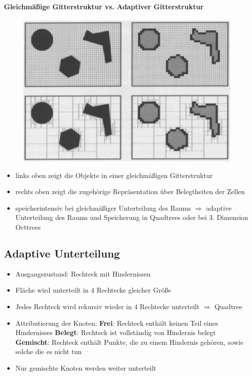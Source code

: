 \paragraph{Gleichmäßige Gitterstruktur vs. Adaptiver Gitterstruktur}
\begin{figure}[H]
	\begin{center}
		\includegraphics[scale=0.5]{Resources/PNG/Quadtrees.PNG}
		\caption{}
		\label{fig:PNG/Quadtrees.PNG}
	\end{center}
\end{figure}
\begin{itemize}
	\item links oben zeigt die Objekte in einer gleichmäßigen Gitterstruktur
	\item rechts oben zeigt die zugehörige Repräsentation über Belegtheiten der Zellen
	\item speicherintensiv bei gleichmäßiger Unterteilung des Raums $\Rightarrow$ adaptive Unterteilung des Raums und Speicherung in Quadtrees oder bei 3. Dimension Octtrees
\end{itemize}
\subsection{Adaptive Unterteilung}
\begin{itemize}
	\item Ausgangszustand: Rechteck mit Hindernissen
	\item Fläche wird unterteilt in 4 Rechtecke gleicher Größe
	\item Jedes Rechteck wird rekursiv wieder in 4 Rechtecke unterteilt $\Rightarrow$ Quadtree
	\item Attributierung der Knoten:
	\subitem \textbf{Frei}: Rechteck enthält keinen Teil eines Hindernisses
	\subitem \textbf{Belegt}: Rechteck ist vollständig von Hindernis belegt
	\subitem \textbf{Gemischt}: Rechteck enthält Punkte, die zu einem Hindernis gehören, sowie solche die es nicht tun
	\item Nur gemischte Knoten werden weiter unterteilt
\end{itemize}

